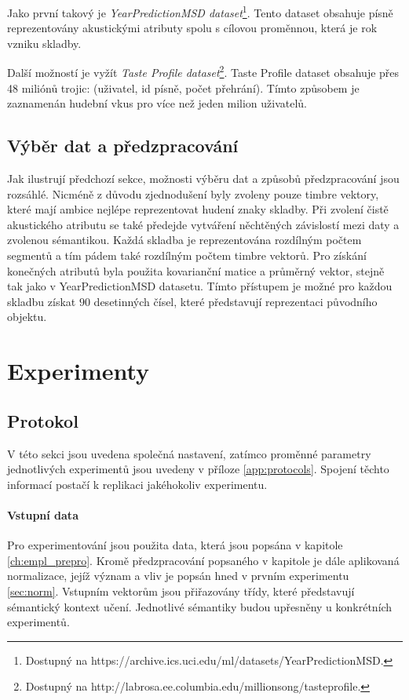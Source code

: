 \documentclass[thesis=M,czech]{FITthesis}[2012/06/26]
\begin{document}
Jako první takový je \textit{YearPredictionMSD dataset}\footnote{Dostupný na https://archive.ics.uci.edu/ml/datasets/YearPredictionMSD.}. Tento dataset obsahuje písně reprezentovány akustickými atributy spolu s cílovou proměnnou, která je rok vzniku skladby. 

Další možností je vyžít \textit{Taste Profile dataset}\footnote{Dostupný na http://labrosa.ee.columbia.edu/millionsong/tasteprofile.}. Taste Profile dataset obsahuje přes 48 miliónů trojic: (uživatel, id písně, počet přehrání). Tímto způsobem je zaznamenán hudební vkus pro více než jeden milion uživatelů.


\section{Výběr dat a předzpracování}
Jak ilustrují předchozí sekce, možnosti výběru dat a způsobů předzpracování jsou rozsáhlé. Nicméně z důvodu zjednodušení byly zvoleny pouze timbre vektory, které mají ambice nejlépe reprezentovat hudení znaky skladby. Při zvolení čistě akustického atributu se také předejde vytváření něchtěných závislostí mezi daty a zvolenou sémantikou. Každá skladba je reprezentována rozdílným počtem segmentů a tím pádem také rozdílným počtem timbre vektorů. Pro získání konečných atributů byla použita kovarianční matice a průměrný vektor, stejně tak jako v YearPredictionMSD datasetu. Tímto přístupem je možné pro každou skladbu získat $90$ desetinných čísel, které představují reprezentaci původního objektu. 




\chapter{Experimenty}
\section{Protokol}

V této sekci jsou uvedena společná nastavení, zatímco proměnné parametry jednotlivých experimentů jsou uvedeny v příloze \ref{app:protocols}. Spojení těchto informací postačí k replikaci jakéhokoliv experimentu.


\subsubsection*{Vstupní data}
Pro experimentování jsou použita data, která jsou popsána v kapitole \ref{ch:empl_prepro}. Kromě předzpracování popsaného v kapitole je dále aplikovaná normalizace, jejíž význam a vliv je popsán hned v prvním experimentu \ref{sec:norm}.
Vstupním vektorům jsou přiřazovány třídy, které představují sémantický kontext učení. Jednotlivé sémantiky budou upřesněny u konkrétních experimentů.
\end{document}
